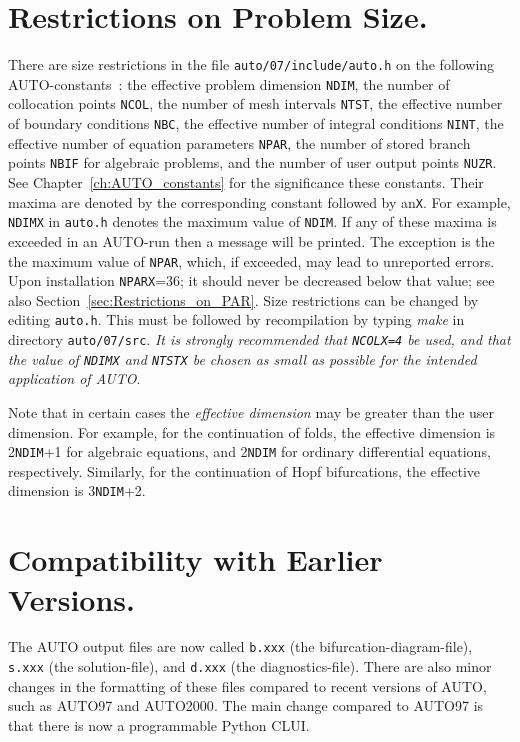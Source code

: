 \documentclass[12pt]{report}
\begin{document}
\section{ Restrictions on Problem Size.} \label{sec:Restrictions}
There are size restrictions in the file {\tt auto/07/include/auto.h}
on the following {\cal AUTO}-constants~:
the effective problem dimension {\tt NDIM},
the number of collocation points {\tt NCOL},
the number of mesh intervals {\tt NTST},
the effective number of boundary conditions {\tt NBC},
the effective number of integral conditions {\tt NINT},
the effective number of equation parameters {\tt NPAR},
the number of stored branch points {\tt NBIF} for algebraic problems,
and the number of user output points {\tt NUZR}. 
See Chapter~\ref{ch:AUTO_constants} 
for the significance these constants. 
Their maxima are denoted by the  corresponding constant followed by an{\tt X}.
For example, {\tt NDIMX} in {\tt auto.h} denotes the maximum value 
of {\tt NDIM}.
If any of these maxima is exceeded in an {\cal AUTO}-run then a message 
will be printed.
The exception is the the maximum value of {\tt NPAR},
which, if exceeded, may lead to unreported errors.
Upon installation {\tt NPARX}=36; it should never be decreased below that value;
see also Section~\ref{sec:Restrictions_on_PAR}.
Size restrictions can be changed by editing {\tt auto.h}.
This must be followed by recompilation by typing {\it make} 
in directory {\tt auto/07/src}.
{\it It is strongly recommended that {\tt NCOLX=4} be used, and that 
the value of {\tt NDIMX} and {\tt NTSTX} be chosen as small as
possible for the intended application of {\cal AUTO}}.

Note that in certain cases the {\it effective dimension} may be greater
than the user dimension.
For example, for the continuation of folds,
the effective dimension is 2{\tt NDIM}+1 for algebraic equations,
and 2{\tt NDIM} for ordinary differential equations, respectively.
Similarly, for the continuation of Hopf bifurcations,
the effective dimension is 3{\tt NDIM}+2.
 
 
\section{Compatibility with Earlier Versions.} \label{sec:Compatibility}
The {\cal AUTO} output files are now called 
{\tt b.xxx} (the bifurcation-diagram-file),
{\tt s.xxx} (the solution-file),
and
{\tt d.xxx} (the diagnostics-file).
There are also minor changes in the formatting of these files 
compared to recent versions of {\cal AUTO}, such as {\cal AUTO97} 
and {\cal AUTO2000}.
The main change compared to {\cal AUTO97} is that there is now a
programmable Python CLUI.
 
\end{document}
